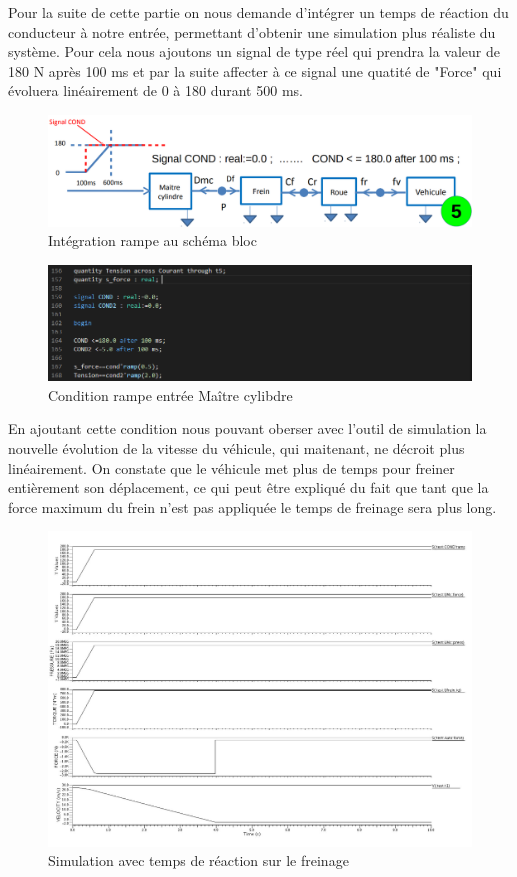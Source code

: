Pour la suite de cette partie on nous demande d'intégrer un temps de réaction du conducteur à notre entrée, permettant d'obtenir une simulation plus réaliste du système. Pour cela nous ajoutons un signal de type réel qui prendra la valeur de 180 N après 100 ms et par la suite affecter à ce signal une quatité de "Force" qui évoluera linéairement de 0 à 180 durant 500 ms.
\begin{figure}[h]
    \centering
    \includegraphics[width=\textwidth]{images/cinq.png}
    \caption{Intégration rampe au schéma bloc}
\end{figure}


\newpage
\begin{figure}[h]
    \centering
    \includegraphics[width=\textwidth]{images/cond.png}
    \caption{Condition rampe entrée Maître cylibdre}
\end{figure}

En ajoutant cette condition nous pouvant oberser avec l'outil de simulation la nouvelle évolution de la vitesse du véhicule, qui maitenant, ne décroit plus linéairement. On constate que le véhicule met plus de temps pour freiner entièrement son déplacement, ce qui peut être expliqué du fait que tant que la force maximum du frein n'est pas appliquée le temps de freinage sera plus long.

\begin{figure}[h]
    \centering
    \includegraphics[width=\textwidth]{images/Instanciation_vehicule_roue_frein_Mc_rampe.jpg}
    \caption{Simulation avec temps de réaction sur le freinage}
\end{figure}

